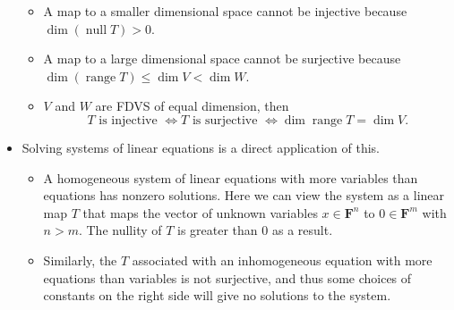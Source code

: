 \documentclass{article}
\newcommand{\F}{\mathbf{F}}
\newcommand{\n}{\operatorname{null}}
\renewcommand{\r}{\operatorname{range}}
\renewcommand{\d}{\dim}
\begin{document}
\begin{itemize}
    \begin{itemize}
        \item A map to a smaller dimensional space cannot be injective because $\d (\n T) > 0$.
        \item A map to a large dimensional space cannot be surjective because $\d (\r T) \leq \d V < \d W$.
        \item $V$ and $W$ are FDVS of equal dimension, then $$T \text{ is injective } \Longleftrightarrow T \text{ is surjective } \Longleftrightarrow \d \r T = \d V.$$
    \end{itemize}
    \item Solving systems of linear equations is a direct application of this.
    \begin{itemize}
        \item A homogeneous system of linear equations with more variables than equations has nonzero solutions. Here we can view the system as a linear map $T$ that maps the vector of unknown variables $x \in \F^n$ to $0 \in \F^m$ with $n > m$. The nullity of $T$ is greater than 0 as a result.
        \item Similarly, the $T$ associated with an inhomogeneous equation with more equations than variables is not surjective, and thus some choices of constants on the right side will give no solutions to the system.
    \end{itemize}
\end{itemize}
\end{document}
